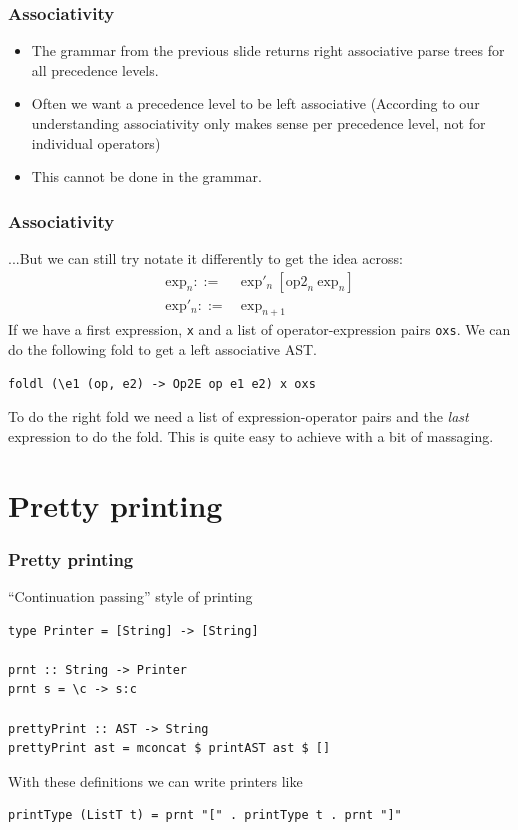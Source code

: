 \documentclass{beamer}
\begin{document}
\begin{frame}[fragile]
\frametitle{Associativity}
\begin{itemize}
\item The grammar from the previous slide returns right associative parse trees for all precedence levels.
\item Often we want a precedence level to be left associative (According to our understanding associativity only makes sense per precedence level, not for individual operators)
\item This cannot be done in the grammar.
\end{itemize}
\end{frame}
\begin{frame}[fragile]
\frametitle{Associativity}
...But we can still try notate it differently to get the idea across:
\begin{align*}
\text{exp}_n ::=&\ \text{exp}'_n\ [ \text{op2}_n\ \text{exp}_n ] \\
\text{exp}'_n ::=&\ \text{exp}_{n+1} 
\end{align*}
If we have a first expression, \lstinline{x} and a list of operator-expression pairs \lstinline{oxs}. We can do the following fold to get a left associative AST.
\begin{lstlisting}
foldl (\e1 (op, e2) -> Op2E op e1 e2) x oxs
\end{lstlisting}

To do the right fold we need a list of expression-operator pairs and the \emph{last} expression to do the fold. This is quite easy to achieve with a bit of massaging. 
\end{frame}

\section{Pretty printing}
\begin{frame}[fragile]
\frametitle{Pretty printing}
``Continuation passing'' style of printing
\begin{lstlisting}
type Printer = [String] -> [String]

prnt :: String -> Printer
prnt s = \c -> s:c

prettyPrint :: AST -> String
prettyPrint ast = mconcat $ printAST ast $ []
\end{lstlisting}

With these definitions we can write printers like

\begin{lstlisting}
printType (ListT t) = prnt "[" . printType t . prnt "]"
\end{lstlisting}

\end{frame}
\end{document}
